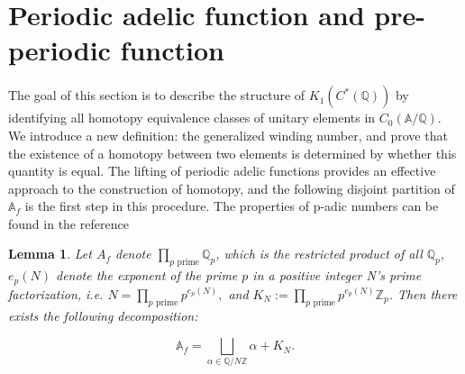 \documentclass[11pt]{article}
\newtheorem{lemma}[theorem]{Lemma}     %
\newcommand{\A}{\mathbb{A}}
\theoremstyle{remark}
\begin{document}
\section{Periodic adelic function and pre-periodic function}
The goal of this section is to describe the structure of \( K_1(C^*(\mathbb{Q})) \) by identifying all homotopy equivalence classes of unitary elements in \( C_0(\mathbb{A}/\mathbb{Q}) \). We introduce a new definition: the generalized winding number, and prove that the existence of a homotopy between two elements is determined by whether this quantity is equal. The lifting of periodic adelic functions provides an effective approach to the construction of homotopy, and the following  disjoint partition of \( \mathbb{A}_f \) is the first step in this procedure. The properties of p-adic numbers can be found in the reference \cite{MR2807433}
\begin{lemma}\label{china}
    Let \( A_f \) denote \(\prod\limits_{p \text{ prime}} \mathbb{Q}_p
 \), which is the restricted product of all \( \mathbb{Q}_p \),  \( e_p(N) \) denote the exponent of the prime \( p \) in a positive integer N's prime factorization, i.e. 
\(
N = \prod\limits_{p \text{ prime}} p^{e_p(N)},
\)
and \(K_N:=\prod\limits_{p \text{ prime}}p^{e_p(N)}\mathbb{Z}_p\). 
Then there exists the following decomposition:

$$
\A_f=\bigsqcup_{\alpha \in \mathbb{Q}/N\mathbb{Z}} \alpha+K_N.
$$
\end{lemma}
\end{document}

